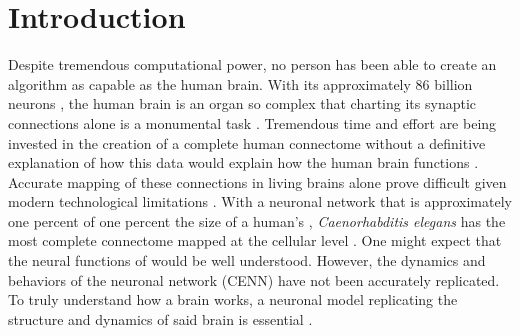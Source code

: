 \section{Introduction}






Despite tremendous computational power, no person has been able to create an algorithm as capable as the human brain. 
With its approximately 86 billion neurons \citep{Azevedo}, the human brain is an organ so complex that charting its synaptic connections alone is a monumental task \citep{VanEssen}. 
Tremendous time and effort are being invested in the creation of a complete human connectome without a definitive explanation of how this data would explain how the human brain functions \citep{Ceylan, Rheault}. 
Accurate mapping of these connections in living brains alone prove difficult given modern technological limitations \citep{Rheault}. 
With a neuronal network that is approximately one percent of one percent the size of a human’s \citep{Azevedo,White}, \textit{Caenorhabditis elegans} has the most complete connectome mapped at the cellular level \citep{White}. 
One might expect that the neural functions of \ce would be well understood. 
However, the dynamics and behaviors of the \ce neuronal network (CENN) have not been accurately replicated. 
To truly understand how a brain works, a neuronal model replicating the structure and dynamics of said brain is essential \citep{Izquierdo}.

